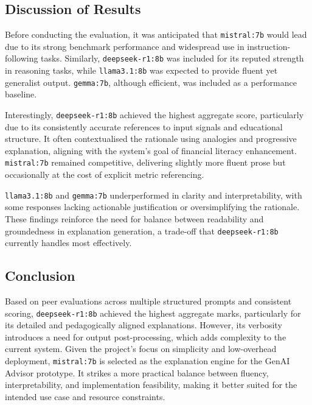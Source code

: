 \subsection{Discussion of Results}

Before conducting the evaluation, it was anticipated that \texttt{mistral:7b} would lead due to its strong benchmark performance and widespread use in instruction-following tasks. Similarly, \texttt{deepseek-r1:8b} was included for its reputed strength in reasoning tasks, while \texttt{llama3.1:8b} was expected to provide fluent yet generalist output. \texttt{gemma:7b}, although efficient, was included as a performance baseline.

Interestingly, \texttt{deepseek-r1:8b} achieved the highest aggregate score, particularly due to its consistently accurate references to input signals and educational structure. It often contextualised the rationale using analogies and progressive explanation, aligning with the system's goal of financial literacy enhancement. \texttt{mistral:7b} remained competitive, delivering slightly more fluent prose but occasionally at the cost of explicit metric referencing.

\texttt{llama3.1:8b} and \texttt{gemma:7b} underperformed in clarity and interpretability, with some responses lacking actionable justification or oversimplifying the rationale. These findings reinforce the need for balance between readability and groundedness in explanation generation, a trade-off that \texttt{deepseek-r1:8b} currently handles most effectively.

\subsection{Conclusion}

Based on peer evaluations across multiple structured prompts and consistent scoring, \texttt{deepseek-r1:8b} achieved the highest aggregate marks, particularly for its detailed and pedagogically aligned explanations. However, its verbosity introduces a need for output post-processing, which adds complexity to the current system. Given the project’s focus on simplicity and low-overhead deployment, \texttt{mistral:7b} is selected as the explanation engine for the GenAI Advisor prototype. It strikes a more practical balance between fluency, interpretability, and implementation feasibility, making it better suited for the intended use case and resource constraints.
